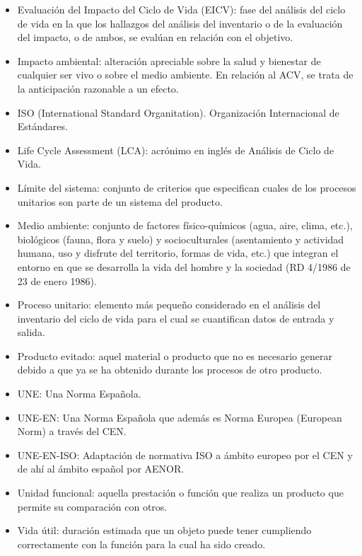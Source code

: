 \begin{itemize}
  \item Evaluación del Impacto del Ciclo de Vida (EICV): fase del análisis del ciclo de vida en la que los hallazgos del análisis del inventario o de la evaluación del impacto, o de ambos, se evalúan en relación con el objetivo.
  \item Impacto ambiental: alteración apreciable sobre la salud y bienestar de cualquier ser vivo o sobre el medio ambiente. En relación al ACV, se trata de la anticipación razonable a un efecto.
  \item ISO (International Standard Organitation). Organización Internacional de Estándares.
  \item Life Cycle Assessment (LCA): acrónimo en inglés de Análisis de Ciclo de Vida.
  \item Límite del sistema: conjunto de criterios que especifican cuales de los procesos unitarios son parte de un sistema del producto.
  \item Medio ambiente: conjunto de factores físico-químicos (agua, aire, clima, etc.), biológicos (fauna, flora y suelo) y socioculturales (asentamiento y actividad humana, uso y disfrute del territorio, formas de vida, etc.) que integran el entorno en que se desarrolla la vida del hombre y la sociedad (RD 4/1986 de 23 de enero 1986).
  \item Proceso unitario: elemento más pequeño considerado en el análisis del inventario del ciclo de vida para el cual se cuantifican datos de entrada y salida.
  \item Producto evitado: aquel material o producto que no es necesario generar debido a que ya se ha obtenido durante los procesos de otro producto.
  \item UNE: Una Norma Española.
  \item UNE-EN: Una Norma Española que además es Norma Europea (European Norm) a través del CEN.
  \item UNE-EN-ISO: Adaptación de normativa ISO a ámbito europeo por el CEN y de ahí al ámbito español por AENOR.
  \item Unidad funcional: aquella prestación o función que realiza un producto que permite su comparación con otros.
  \item Vida útil: duración estimada que un objeto puede tener cumpliendo correctamente con la función para la cual ha sido creado.
\end{itemize}
